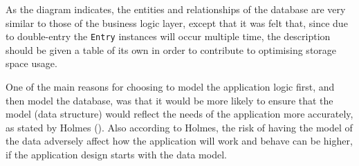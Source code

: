 As the diagram indicates, the entities and relationships of the database are
very similar to those of the business logic layer, except that it was felt
that, since due to double-entry the \texttt{Entry} instances will occur
multiple time, the description should be given a table of its own in order to
contribute to optimising storage space usage.

One of the main reasons for choosing to model the application logic first, and
then model the database, was that it would be more likely to ensure that the
model (data structure) would reflect the needs of the application more
accurately, as stated by Holmes (\citeyear[][p.~141]{holmes2018mean}). Also
according to Holmes, the risk of having the model of the data adversely affect
how the application will work and behave can be higher, if the application
design starts with the data model.
